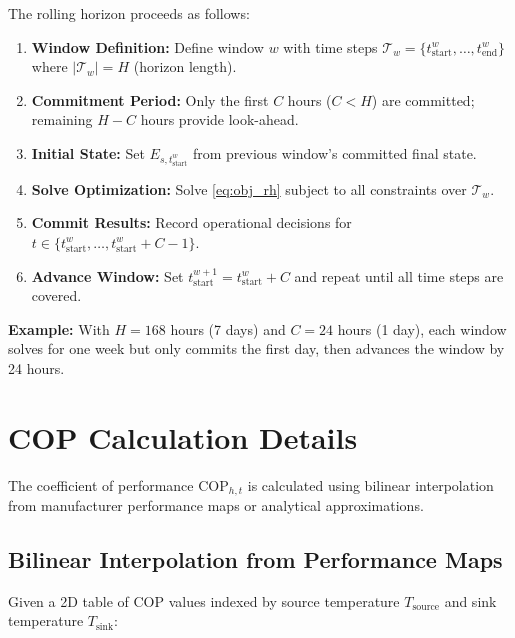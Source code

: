 \documentclass[11pt]{article}
\begin{document}
The rolling horizon proceeds as follows:

\begin{enumerate}
\item \textbf{Window Definition:} Define window $w$ with time steps $\mathcal{T}_w = \{t_{\text{start}}^w, \ldots, t_{\text{end}}^w\}$ where $|\mathcal{T}_w| = H$ (horizon length).

\item \textbf{Commitment Period:} Only the first $C$ hours ($C < H$) are committed; remaining $H - C$ hours provide look-ahead.

\item \textbf{Initial State:} Set $E_{s,t_{\text{start}}^w}$ from previous window's committed final state.

\item \textbf{Solve Optimization:} Solve \eqref{eq:obj_rh} subject to all constraints over $\mathcal{T}_w$.

\item \textbf{Commit Results:} Record operational decisions for $t \in \{t_{\text{start}}^w, \ldots, t_{\text{start}}^w + C - 1\}$.

\item \textbf{Advance Window:} Set $t_{\text{start}}^{w+1} = t_{\text{start}}^w + C$ and repeat until all time steps are covered.
\end{enumerate}

\textbf{Example:} With $H = 168$ hours (7 days) and $C = 24$ hours (1 day), each window solves for one week but only commits the first day, then advances the window by 24 hours.

\section{COP Calculation Details}

The coefficient of performance $\text{COP}_{h,t}$ is calculated using bilinear interpolation from manufacturer performance maps or analytical approximations.

\subsection{Bilinear Interpolation from Performance Maps}

Given a 2D table of COP values indexed by source temperature $T_{\text{source}}$ and sink temperature $T_{\text{sink}}$:
\end{document}
